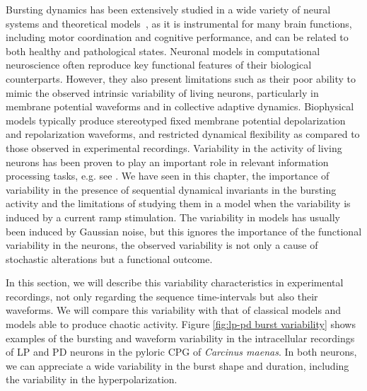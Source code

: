Bursting dynamics has been extensively studied in a wide variety of neural systems and theoretical models~\parencite{coombes2005bursting,izhikevich_dynamical_2007,Zendenrust18}, as it is instrumental for many brain functions, including motor coordination and cognitive performance, and can be related to both healthy and pathological states. Neuronal models in computational neuroscience often reproduce key functional features of their biological counterparts. However, they also present limitations such as their poor ability to mimic the observed intrinsic variability of living neurons, particularly in membrane potential waveforms and in collective adaptive dynamics. Biophysical models typically produce stereotyped fixed membrane potential depolarization and repolarization waveforms, and restricted dynamical flexibility as compared to those observed in experimental recordings. Variability in the activity of living neurons has been proven to play an important role in relevant information processing tasks, e.g. see  \parencite{Stein2005, Waschke2021}. We have seen in this chapter, the importance of variability in the presence of sequential dynamical invariants in the bursting activity and the limitations of studying them in a model when the variability is induced by a current ramp stimulation. The variability in models has usually been induced by Gaussian noise, but this ignores the importance of the functional variability in the neurons, the observed variability is not only a cause of stochastic alterations but a functional outcome. 

In this section, we will describe this variability characteristics in experimental recordings, not only regarding the sequence time-intervals but also their waveforms. We will compare this variability with that of classical models and models able to produce chaotic activity. 
Figure \ref{fig:lp-pd burst variability} shows examples of the bursting and waveform variability in the intracellular recordings of LP and PD neurons in the pyloric CPG of \textit{Carcinus maenas}. In both neurons, we can appreciate a wide variability in the burst shape and duration, including the variability in the hyperpolarization.

